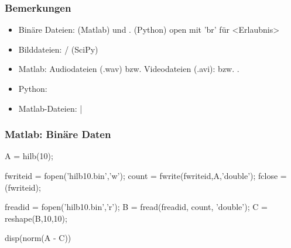 \documentclass[hyperref={xetex}]{beamer}
\begin{document}
%
%
\begin{frame}[fragile]\frametitle{Bemerkungen}
\begin{itemize}
\item Binäre Dateien: (Matlab) \alert{} und \alert{}. (Python) open mit 'br' für <Erlaubnis>
\item Bilddateien: \alert{/} (SciPy)
\item Matlab: Audiodateien (.wav) bzw. Videodateien (.avi):
\alert{} bzw. \alert{}. 
\item Python: 
 \item Matlab-Dateien:  |  
\end{itemize}
\end{frame}
%
%
\begin{frame}[fragile]\frametitle{Matlab:  Bin\"are Daten}
\begin{matlabin}
A = hilb(10);

fwriteid = fopen('hilb10.bin','w');
count = fwrite(fwriteid,A,'double');
fclose = (fwriteid);

freadid = fopen('hilb10.bin','r');
B = fread(freadid, count, 'double');
C = reshape(B,10,10);

disp(norm(A - C))
\end{matlabin}
\end{frame}
%
%
\end{document}
